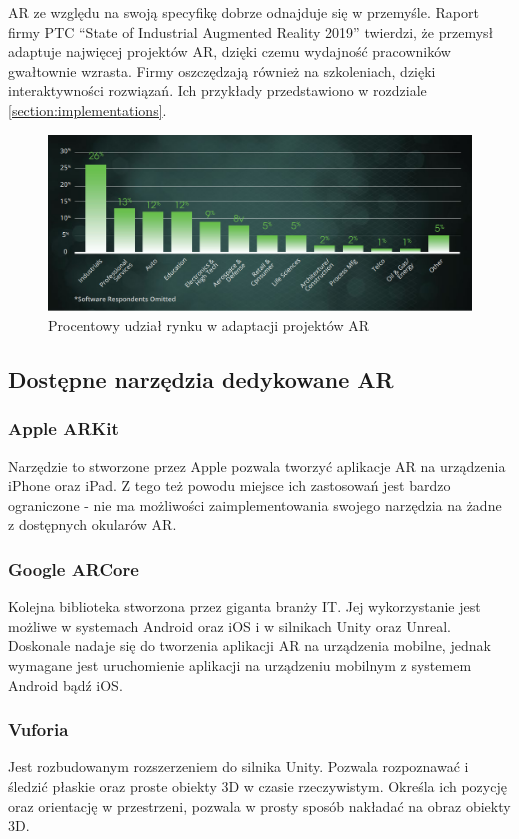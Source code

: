 \documentclass[12pt,twoside,polish]{article}
\begin{document}
AR ze względu na swoją specyfikę dobrze odnajduje się w przemyśle. Raport firmy PTC \enquote{State of Industrial Augmented Reality 2019} \cite{ptcreport} twierdzi, że przemysł adaptuje najwięcej projektów AR, dzięki czemu wydajność pracowników gwałtownie wzrasta. Firmy oszczędzają również na szkoleniach, dzięki interaktywności rozwiązań. Ich przykłady przedstawiono w rozdziale \ref{section:implementations}.


\begin{figure}
\centering
\includegraphics[width=\textwidth]{arbyindustry}
\caption{Procentowy udział rynku w adaptacji projektów AR}
\end{figure}

\subsection{Dostępne narzędzia dedykowane AR}
\subsubsection*{Apple ARKit}
Narzędzie to stworzone przez Apple pozwala tworzyć aplikacje AR na urządzenia iPhone oraz iPad. Z tego też powodu miejsce ich zastosowań jest bardzo ograniczone - nie ma możliwości zaimplementowania swojego narzędzia na żadne z dostępnych okularów AR.

\subsubsection*{Google ARCore}
Kolejna biblioteka stworzona przez giganta branży IT. Jej wykorzystanie jest możliwe w systemach Android oraz iOS i w silnikach Unity oraz Unreal. Doskonale nadaje się do tworzenia aplikacji AR na urządzenia mobilne, jednak wymagane jest uruchomienie aplikacji na urządzeniu mobilnym z systemem Android bądź iOS.

\subsubsection*{Vuforia}
Jest rozbudowanym rozszerzeniem do silnika Unity. Pozwala rozpoznawać i śledzić płaskie oraz proste obiekty 3D w czasie rzeczywistym. Określa ich pozycję oraz orientację w przestrzeni, pozwala w prosty sposób nakładać na obraz obiekty 3D.
\end{document}
